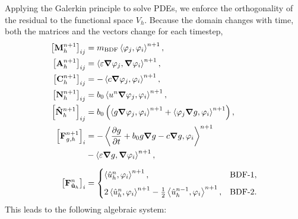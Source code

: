 \documentclass[../../thesis.tex]{subfiles}
\newcommand{\inner}[2]{\left<#1, #2\right>}
\begin{document}
Applying the Galerkin principle to solve PDEs, 
we enforce the orthogonality of the residual to the functional space $V_h$. 
Because the domain changes with time, 
both the matrices and the vectors change for each timestep,
\begin{subequations}
    \label{eq:1d_fom_linear_system_operators}
    \begin{align}
        \left[\vb{M}_{h}^{n+1}\right]_{ij}           
        &= m_{\text{BDF}} \inner{\varphi_j}{\varphi_i}^{n+1}, 
        \\
        \left[\vb{A}_{h}^{n+1}\right]_{ij}           
        &= \inner{\varepsilon \grad \varphi_j}{\grad \varphi_i}^{n+1}, 
        \\
        \left[\vb{C}_{h}^{n+1}\right]_{ij}           
        &= -\inner{c \grad \varphi_j}{\varphi_i}^{n+1}, 
        \\
        \left[\vb{N}_{h}^{n+1}\right]_{ij}           
        &= b_0 \inner{u^{n} \grad \varphi_j}{\varphi_i}^{n+1}, 
        \\
        \left[\vb{\hat{N}}_{h}^{n+1}\right]_{ij}     
        &= b_0 \left(
            \inner{g \grad \varphi_j}{\varphi_i}^{n+1} + 
            \inner{\varphi_j \grad g}{\varphi_i}^{n+1}
            \right), 
        \\
        \left[\vb{F}_{{g,h}}^{n+1}\right]_{i}        
        &= -\inner{\pdv{g}{t} + b_0 g \grad g - c \grad g}{\varphi_i}^{n+1} \nonumber
        \\
        &  -\inner{\varepsilon \grad g}{\grad \varphi_i}^{n+1},
        \label{eq:1d_fom_linear_system_operators_fg}
        \\[2mm]
        \left[\vb{F}_{\vb{\hat{u}}_h}^{n}\right]_{i} &= 
            \begin{cases}
                \inner{\hat{u}_h^{n}}{\varphi_i}^{n+1},                &\text{BDF-1},
                \\[2mm]
                2\inner{\hat{u}_h^{n}}{\varphi_i}^{n+1}
                - \frac{1}{2}\inner{\hat{u}_h^{n-1}}{\varphi_i}^{n+1}, &\text{BDF-2}.
            \end{cases}
    \end{align}
\end{subequations}
This leads to the following algebraic system:
\end{document}

